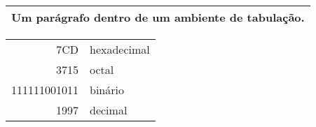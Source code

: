 \documentclass[a4paper, 12pt]{article}
\begin{document}
\begin{flushleft}
\begin{center}
\begin{tabular}{|p{5cm}|}
\hline
Um parágrafo dentro de um ambiente de tabulação.\\
\hline
\end{tabular}
\singlespacing
\end{center} 

\begin{center}

\begin{tabular}{|r|l|}
\hline
7CD & hexadecimal \\
3715 & octal \\
111111001011 & binário \\
\hline \hline
1997 & decimal \\
\hline
\end{tabular}
\end{center}


\end{flushleft}
\end{document}
